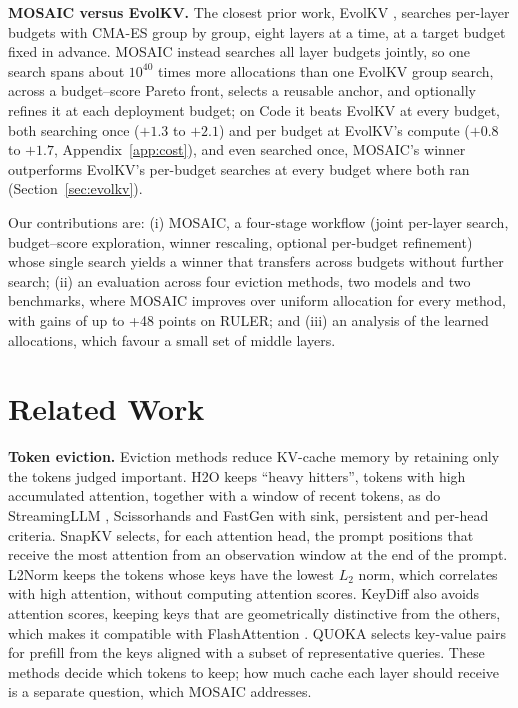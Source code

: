 \documentclass[11pt]{article}
\begin{document}
\textbf{MOSAIC versus EvolKV.}\label{sec:intro-evolkv} The closest prior work, EvolKV \citep{yu2025evolkv}, searches per-layer budgets with CMA-ES \citep{hansen2001cmaes} group by group, eight layers at a time, at a target budget fixed in advance. MOSAIC instead searches all layer budgets jointly, so one search spans about $10^{40}$ times more allocations than one EvolKV group search, across a budget--score Pareto front, selects a reusable anchor, and optionally refines it at each deployment budget; on Code it beats EvolKV at every budget, both searching once ($+1.3$ to $+2.1$) and per budget at EvolKV's compute ($+0.8$ to $+1.7$, Appendix~\ref{app:cost}), and even searched once, MOSAIC's winner outperforms EvolKV's per-budget searches at every budget where both ran (Section~\ref{sec:evolkv}).

Our contributions are: (i) MOSAIC, a four-stage workflow (joint per-layer search, budget--score exploration, winner rescaling, optional per-budget refinement) whose single search yields a winner that transfers across budgets without further search; (ii) an evaluation across four eviction methods, two models and two benchmarks, where MOSAIC improves over uniform allocation for every method, with gains of up to +48 points on RULER; and (iii) an analysis of the learned allocations, which favour a small set of middle layers.

\section{Related Work}

\textbf{Token eviction.} Eviction methods reduce KV-cache memory by retaining only the tokens judged important. H2O \citep{zhang2023h2o} keeps ``heavy hitters'', tokens with high accumulated attention, together with a window of recent tokens, as do StreamingLLM \citep{xiao2024streamingllm}, Scissorhands \citep{liu2023scissorhands} and FastGen \citep{ge2024fastgen} with sink, persistent and per-head criteria. SnapKV \citep{li2024snapkv} selects, for each attention head, the prompt positions that receive the most attention from an observation window at the end of the prompt. L2Norm \citep{devoto2024l2norm} keeps the tokens whose keys have the lowest $L_2$ norm, which correlates with high attention, without computing attention scores. KeyDiff \citep{park2025keydiff} also avoids attention scores, keeping keys that are geometrically distinctive from the others, which makes it compatible with FlashAttention \citep{dao2024flashattention2}. QUOKA \citep{jones2026quoka} selects key-value pairs for prefill from the keys aligned with a subset of representative queries. These methods decide which tokens to keep; how much cache each layer should receive is a separate question, which MOSAIC addresses.
\end{document}
